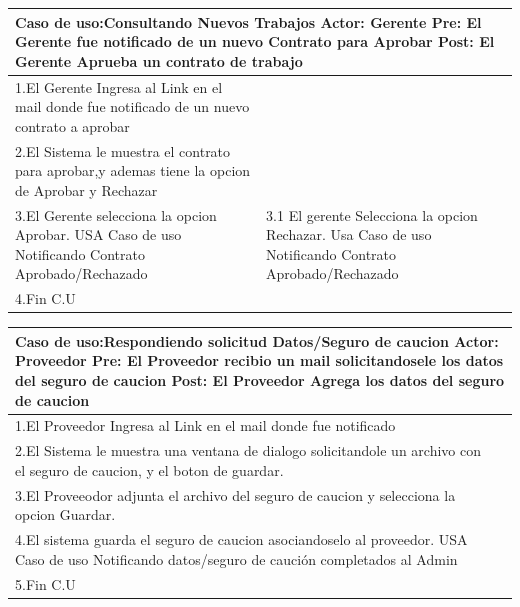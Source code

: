 \begin{longtable}{|p{}|p{}|}
    \hline
    \multicolumn{2}{|p{16cm}|}{
        \textbf{Caso de uso:}Consultando Nuevos Trabajos\newline
        \textbf{Actor:} Gerente\newline
        \textbf{Pre: }El Gerente fue notificado de un nuevo Contrato para Aprobar\newline
        \textbf{Post:}  El Gerente Aprueba un contrato de trabajo
    }\\
    \hline
    1.El Gerente Ingresa al Link en el mail donde fue notificado de un nuevo contrato a aprobar&    \\
    \hline
    2.El Sistema le muestra el contrato para aprobar,y ademas tiene la opcion de Aprobar y Rechazar& \\
    \hline
    3.El Gerente selecciona la opcion Aprobar. USA Caso de uso Notificando Contrato Aprobado/Rechazado& 3.1 El gerente Selecciona la opcion Rechazar. Usa Caso de uso Notificando Contrato Aprobado/Rechazado\\
    \hline
    4.Fin C.U&\\
    \hline
\end{longtable}
\begin{longtable}{|p{}|p{}|}
    \hline
    \multicolumn{2}{|p{16cm}|}{
        \textbf{Caso de uso:}Respondiendo solicitud Datos/Seguro de caucion\newline
        \textbf{Actor:} Proveedor\newline
        \textbf{Pre: }El Proveedor recibio un mail solicitandosele los datos del seguro de caucion\newline
        \textbf{Post:}  El Proveedor Agrega los datos del seguro de caucion
    }\\
    \hline
    1.El Proveedor Ingresa al Link en el mail donde fue notificado&    \\
    \hline
    2.El Sistema le muestra una ventana de dialogo solicitandole un archivo con el seguro de caucion, y el boton de guardar.& \\
    \hline
    3.El Proveeodor adjunta el archivo del seguro de caucion y selecciona la opcion Guardar. &\\
    \hline
    4.El sistema guarda el seguro de caucion asociandoselo al proveedor. USA Caso de uso Notificando datos/seguro de caución completados al Admin&\\
    \hline
    5.Fin C.U&\\
    \hline
\end{longtable}

